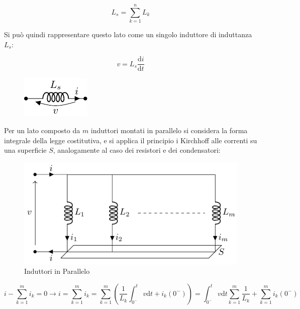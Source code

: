 \documentclass{article}
\newcommand{\df}{\mathrm{d}}
\numberwithin{equation}{subsection}
\begin{document}
\begin{equation*}
    L_s=\displaystyle\sum_{k=1}^nL_k
\end{equation*}

Si può quindi rappresentare questo lato come un singolo induttore di induttanza $L_s$:

\begin{equation}
    v=L_s\displaystyle\frac{\df i}{\df t}
\end{equation}

\begin{figure}[H]%
    \centering
    \includegraphics{induttore-serie-equivalente.pdf}%
    \label{fig:induttore-serie-equivalente}
\end{figure}



Per un lato composto da $m$ induttori montati in parallelo si considera la forma integrale della legge costitutiva, e si applica il principio i Kirchhoff alle correnti su una 
superficie $S$, analogamente al caso dei resistori e dei condensatori:

\begin{figure}[H]%
    \centering
    \includegraphics{induttore-parallelo.pdf}%
    \caption{Induttori in Parallelo}%
    \label{fig:induttore-parallelo}
\end{figure}

\begin{equation*}
    i-\displaystyle\sum_{k=1}^mi_k=0\to i=\sum_{k=1}^mi_k=\sum_{k=1}^m\left(\frac{1}{L_k}\int_{0^-}^t v\df t+i_k(0^-)\right)=\int_{0^-}^t v\df t\sum_{k=1}^m\frac{1}{L_k}+\sum_{k=1}^mi_k(0^-)
\end{equation*}
\end{document}
